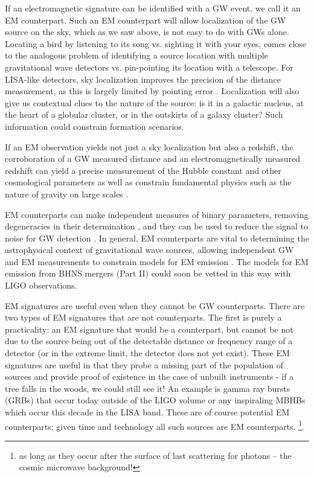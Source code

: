 If an electromagnetic signature can be identified with a GW event, we call it
an EM counterpart. Such an EM counterpart will allow localization of the GW
source on the sky, which as we saw above, is not easy to do with GWs alone.
Locating a bird by listening to its song vs. sighting it with your eyes, comes
close to the analogous problem of identifying a source location with multiple
gravitational wave detectors vs. pin-pointing its location with a telescope.
For LISA-like detectors, sky localization improves the
precision of the distance measurement, as this is largely limited by pointing
error \citep{Cutler:1998, Hughes:2002}. Localization will also give us contextual
clues to the nature of the source: is it in a galactic nucleus, at the heart
of a globular cluster, or in the outskirts of a galaxy cluster? Such
information could constrain formation scenarios.

If an EM observation yields not just a sky localization but also a redshift,
the corroboration of a GW measured distance and an electromagnetically
measured redshift can yield a precise measurement of the Hubble constant and
other cosmological parameters \citep{Schutz:1986, KrolakSchutz:1987,
ChernoffFinn:1993, Schutz:2002, HolzHughes:2005, Dalal:2006, Kocsis+2006,
Kocsis+2008, CutlerHolz:2009,  Nissanke:GRBStndSirens:2010, Nishizawa:StndSirens:2011, Taylor:StndSirens:2012,
Tamanini:2016} as well as constrain fundamental physics such as the nature of
gravity on large scales \citep{Deffayet:2007, Camera:StndSirens:2013}.

EM counterparts can make independent measures of binary parameters, removing
degeneracies in their determination \citep{HughesHolz:2003}, and they can be
used to reduce the signal to noise for GW detection \citep{KochanekPiran:1993,
HarryFairhurst:2011}. In general, EM counterparts are vital to determining the
astrophysical context of gravitational wave sources, allowing independent GW
and EM measurements to constrain models for EM emission \citep{Phinney:2009,
MandelO'Sh:2010}. The models for EM emission from BHNS mergers (Part II) could
soon be vetted in this way with LIGO observations.

EM signatures are useful even when they cannot be GW counterparts. There are
two types of EM signatures that are not counterparts. The first is  purely a
practicality: an EM signature that would be a counterpart, but cannot be not
due to the source being out of the detectable distance or frequency range of a
detector (or in the extreme limit, the detector does not yet exist). These EM
signatures are useful in that they probe a missing part of the population of
sources and provide proof of existence in the case of unbuilt instruments - if
a tree falls in the woods, we could still see it! An example is gamma ray
bursts (GRBs) that occur today outside of the LIGO volume or any inspiraling
MBHBs which occur this decade in the LISA band. These are of course potential
EM counterparts; given time and technology all such sources are EM
counterparts. \footnote{as long as they occur after the surface of last
scattering for photons -- the cosmic microwave background!}. 

